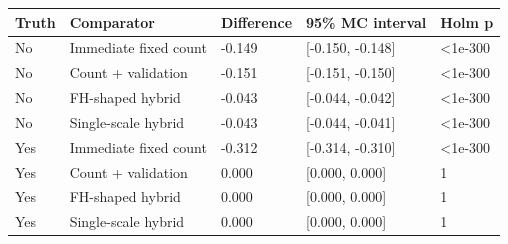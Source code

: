 \begin{tabular}{lllll}
\toprule
Truth & Comparator & Difference & 95\% MC interval & Holm p \\
\midrule
No & Immediate fixed count & -0.149 & [-0.150, -0.148] & <1e-300 \\
No & Count + validation & -0.151 & [-0.151, -0.150] & <1e-300 \\
No & FH-shaped hybrid & -0.043 & [-0.044, -0.042] & <1e-300 \\
No & Single-scale hybrid & -0.043 & [-0.044, -0.041] & <1e-300 \\
Yes & Immediate fixed count & -0.312 & [-0.314, -0.310] & <1e-300 \\
Yes & Count + validation & 0.000 & [0.000, 0.000] & 1 \\
Yes & FH-shaped hybrid & 0.000 & [0.000, 0.000] & 1 \\
Yes & Single-scale hybrid & 0.000 & [0.000, 0.000] & 1 \\
\bottomrule
\end{tabular}
